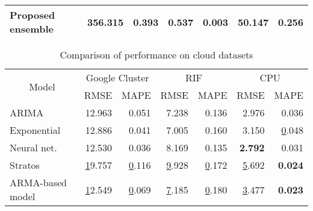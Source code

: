 \begin{table}[]
\begin{tabular}{|l|l|r|r|r|r|r|}
Proposed ensemble                                     & \textbf{356.315}        & \textbf{0.393} & 0.537 & \textbf{0.003} &  50.147 & 0.256 \\ \hline
\end{tabular}
\end{table}

\begin{table}[]
\centering
\caption{Comparison of performance on cloud datasets}
\begin{tabular}{|l|r|r|r|r|r|r|}
\hline
\multicolumn{1}{|c|}{\multirow{2}{*}{Model}} & \multicolumn{2}{c|}{Google Cluster}                   & \multicolumn{2}{c|}{RIF}                              & \multicolumn{2}{c|}{CPU}                              \\ \cline{2-7} 
\multicolumn{1}{|c|}{}                       & \multicolumn{1}{c|}{RMSE} & \multicolumn{1}{c|}{MAPE} & \multicolumn{1}{c|}{RMSE} & \multicolumn{1}{c|}{MAPE} & \multicolumn{1}{c|}{RMSE} & \multicolumn{1}{c|}{MAPE} \\ \hline
ARIMA                                        & 12.963                    & 0.051                     & 7.238                     & 0.136                     & 2.976                     & 0.036                     \\ \hline
Exponential                                  & 12.886                    & 0.041                     & 7.005                     & 0.160                     & 3.150                     & {\ul 0.048}               \\ \hline
Neural net.                                  & 12.530                    & 0.036                     & 8.169                     & 0.135                     & \textbf{2.792}            & 0.031                     \\ \hline
Stratos                                      & {\ul 19.757}              & {\ul 0.116}               & {\ul 9.928}               & {\ul 0.172}               & {\ul 5.692}               & \textbf{0.024}            \\ \hline

ARMA-based model                                      & {\ul 12.549}              & {\ul 0.069}               & {\ul 7.185}               & {\ul 0.180}               & {\ul 3.477}               & \textbf{0.023}            \\ \hline


\end{tabular}
\end{table}
